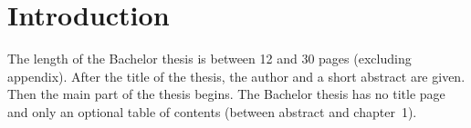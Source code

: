 \section{Introduction}

The length of the Bachelor thesis is between 12 and 30 pages (excluding appendix).
After the title of the thesis, the author and a short abstract are given.
Then the main part of the thesis begins.
The Bachelor thesis has no title page and only an optional table of contents
(between abstract and chapter~1).